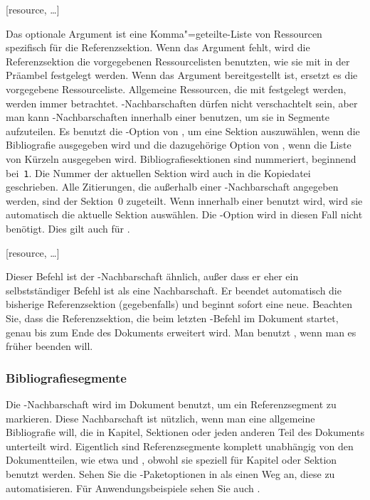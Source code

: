 \documentclass{ltxdockit}[2011/03/25]
\begin{document}
\begin{ltxsyntax}

[resource, \dots]

Das optionale Argument ist eine Komma"=geteilte-Liste von Ressourcen
spezifisch für die Referenzsektion. Wenn das Argument fehlt, wird die 
Referenzsektion die
vorgegebenen Ressourcelisten benutzten, wie sie mit  in der
Präambel festgelegt werden. Wenn das Argument bereitgestellt ist, ersetzt es die
vorgegebene Ressourceliste. Allgemeine Ressourcen, die mit 
festgelegt werden, werden immer betrachtet. -Nachbarschaften
dürfen nicht verschachtelt sein, aber man kann -Nachbarschaften
innerhalb einer  benutzen, um sie in Segmente aufzuteilen.
Es benutzt die -Option von , um eine
Sektion auszuwählen, wenn die Bibliografie ausgegeben wird und die dazugehörige Option
von , wenn die Liste von Kürzeln ausgegeben wird.
Bibliografiesektionen sind nummeriert, beginnend bei~\texttt{1}. Die Nummer der
aktuellen Sektion wird auch in die Kopiedatei geschrieben. Alle Zitierungen, die
außerhalb einer -Nachbarschaft angegeben werden, sind der
Sektion~0 zugeteilt. Wenn  innerhalb einer
 benutzt wird, wird sie automatisch die aktuelle Sektion
auswählen. Die -Option wird in diesen Fall nicht benötigt. Dies
gilt auch für .      

[resource, \dots]

Dieser Befehl ist der -Nachbarschaft ähnlich, außer dass er eher
ein selbstständiger Befehl ist als eine Nachbarschaft. Er beendet automatisch
die bisherige Referenzsektion (gegebenfalls) und beginnt sofort eine neue.
Beachten Sie, dass die Referenzsektion, die beim letzten -Befehl
im Dokument startet, genau bis zum Ende des Dokuments erweitert wird.
Man benutzt , wenn man es früher beenden will.  

\end{ltxsyntax}


\subsubsection{Bibliografiesegmente} \label{use:bib:seg}

Die -Nachbarschaft wird im Dokument benutzt, um ein
Referenzsegment zu markieren. Diese Nachbarschaft ist nützlich, wenn man eine
allgemeine Bibliografie will, die in Kapitel, Sektionen oder jeden anderen Teil
des Dokuments unterteilt wird. Eigentlich sind Referenzsegmente komplett
unabhängig von den Dokumentteilen, wie etwa  und ,
obwohl sie speziell für Kapitel oder Sektion benutzt werden. Sehen Sie die
-Paketoptionen in  als einen Weg an, diese zu
automatisieren. Für Anwendungsbeispiele sehen Sie auch .  
\end{document}
